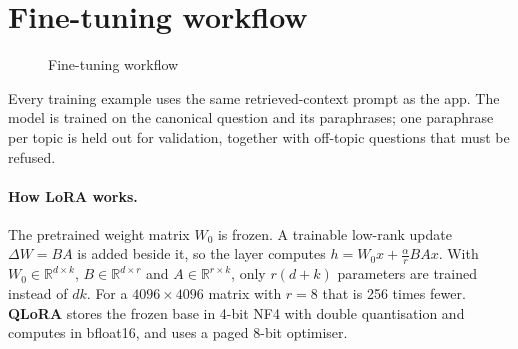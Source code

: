 \documentclass[11pt,a4paper]{report}
\begin{document}
\section{Fine-tuning workflow}
\begin{figure}[H]
\centering
{}
\caption{Fine-tuning workflow}\label{fig:ftflow}
\end{figure}

Every training example uses the same retrieved-context prompt as the app. The model is trained on
the canonical question and its paraphrases; one paraphrase per topic is held out for validation,
together with off-topic questions that must be refused.

\paragraph{How LoRA works.} The pretrained weight matrix $W_0$ is frozen. A trainable low-rank
update $\Delta W = BA$ is added beside it, so the layer computes $h = W_0x + \frac{\alpha}{r}BAx$.
With $W_0 \in \mathbb{R}^{d\times k}$, $B \in \mathbb{R}^{d\times r}$ and
$A \in \mathbb{R}^{r\times k}$, only $r(d+k)$ parameters are trained instead of $dk$. For a
$4096\times4096$ matrix with $r=8$ that is 256 times fewer. \textbf{QLoRA} stores the frozen base
in 4-bit NF4 with double quantisation and computes in bfloat16, and uses a paged 8-bit optimiser.
\end{document}
